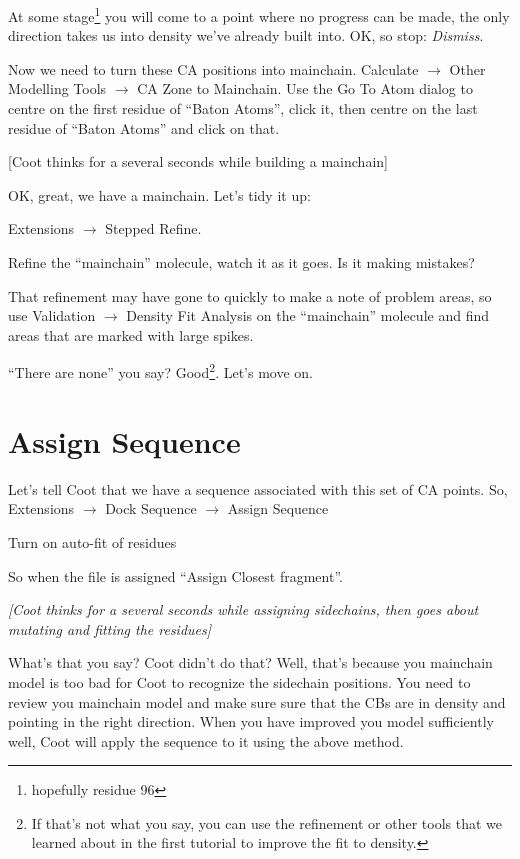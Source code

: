 \documentclass{article}
\begin{document}
At some stage\footnote{hopefully residue 96} you will come to a point
where no progress can be made, the only direction takes us into
density we've already built into.  OK, so stop: \textsl{Dismiss}.

Now we need to turn these CA positions into mainchain.
\textsf{Calculate $\rightarrow$ Other Modelling Tools $\rightarrow$ CA
  Zone to Mainchain}.  Use the \textsf{Go To Atom} dialog to centre on the
first residue of ``Baton Atoms'', click it, then centre on the last
residue of ``Baton Atoms'' and click on that.

\textsf{  [Coot thinks for a several seconds while building a mainchain]}

OK, great, we have a mainchain.  Let's tidy it up:

\textsf{Extensions $\rightarrow$ Stepped Refine}.  

Refine the ``mainchain'' molecule, watch it as it goes.  Is it making
mistakes?

That refinement may have gone to quickly to make a note of problem
areas, so use \textsf{Validation $\rightarrow$ Density Fit Analysis}
on the ``mainchain'' molecule and find areas that are marked with
large spikes.

``There are none'' you say?  Good\footnote{If that's not what you say,
  you can use the refinement or other tools that we learned about in
  the first tutorial to improve the fit to density.}. Let's move on.

\section{Assign Sequence}

Let's tell Coot that we have a sequence associated with this set
of CA points.  So, \textsf{Extensions $\rightarrow$ Dock Sequence
  $\rightarrow$ Assign Sequence}

Turn on auto-fit of residues

So when the file is assigned ``Assign Closest fragment''.

\textsl{ [Coot thinks for a several seconds while assigning
  sidechains, then goes about mutating and fitting the residues]}

What's that you say?  Coot didn't do that?  Well, that's because you
mainchain model is too bad for Coot to recognize the sidechain
positions.  You need to review you mainchain model and make sure sure
that the CBs are in density and pointing in the right direction.  When
you have improved you model sufficiently well, Coot will apply the
sequence to it using the above method.
\end{document}
